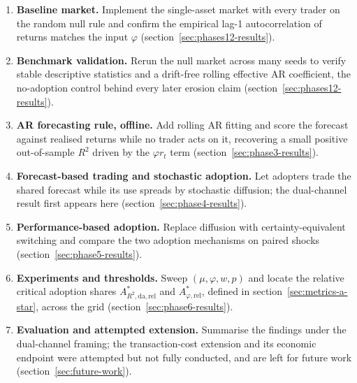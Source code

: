\documentclass[12pt]{article}
\begin{document}
\begin{enumerate}[itemsep=2pt]
\item \textbf{Baseline market.} Implement the single-asset market with every trader on the random null rule and confirm the empirical lag-1 autocorrelation of returns matches the input $\varphi$ (section~\ref{sec:phases12-results}). %
\item \textbf{Benchmark validation.} Rerun the null market across many seeds to verify stable descriptive statistics and a drift-free rolling effective AR coefficient, the no-adoption control behind every later erosion claim (section~\ref{sec:phases12-results}). %
\item \textbf{AR forecasting rule, offline.} Add rolling AR fitting and score the forecast against realised returns while no trader acts on it, recovering a small positive out-of-sample $R^{2}$ driven by the $\varphi r_t$ term (section~\ref{sec:phase3-results}). %
\item \textbf{Forecast-based trading and stochastic adoption.} Let adopters trade the shared forecast while its use spreads by stochastic diffusion; the dual-channel result first appears here (section~\ref{sec:phase4-results}). %
\item \textbf{Performance-based adoption.} Replace diffusion with certainty-equivalent switching and compare the two adoption mechanisms on paired shocks (section~\ref{sec:phase5-results}). %
\item \textbf{Experiments and thresholds.} Sweep $(\mu, \varphi, w, p)$ and locate the relative critical adoption shares $A^{*}_{R^{2},\mathrm{da},\mathrm{rel}}$ and $A^{*}_{\varphi,\mathrm{rel}}$, defined in section~\ref{sec:metrics-a-star}, across the grid (section~\ref{sec:phase6-results}). %
\item \textbf{Evaluation and attempted extension.} Summarise the findings under the dual-channel framing; the transaction-cost extension and its economic endpoint were attempted but not fully conducted, and are left for future work (section~\ref{sec:future-work}). %
\end{enumerate}
\end{document}
